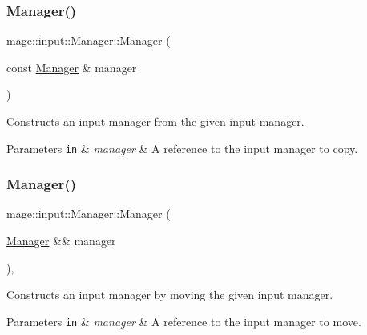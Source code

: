 \subsubsection{\texorpdfstring{Manager()}{Manager()}\hspace{0.1cm}{\footnotesize\ttfamily [2/3]}}
{\footnotesize\ttfamily mage\+::input\+::\+Manager\+::\+Manager (\begin{DoxyParamCaption}\item[{const \hyperlink{classmage_1_1input_1_1_manager}{Manager} \&}]{manager }\end{DoxyParamCaption})\hspace{0.3cm}{\ttfamily [delete]}}

Constructs an input manager from the given input manager.


\begin{DoxyParams}[1]{Parameters}
\mbox{\tt in}  & {\em manager} & A reference to the input manager to copy. \\
\hline
\end{DoxyParams}
\hypertarget{classmage_1_1input_1_1_manager_ab4aae9f96e63bdb8d4ab0de08932b2eb}{}\label{classmage_1_1input_1_1_manager_ab4aae9f96e63bdb8d4ab0de08932b2eb} 
\subsubsection{\texorpdfstring{Manager()}{Manager()}\hspace{0.1cm}{\footnotesize\ttfamily [3/3]}}
{\footnotesize\ttfamily mage\+::input\+::\+Manager\+::\+Manager (\begin{DoxyParamCaption}\item[{\hyperlink{classmage_1_1input_1_1_manager}{Manager} \&\&}]{manager }\end{DoxyParamCaption})\hspace{0.3cm}{\ttfamily [default]}, {\ttfamily [noexcept]}}

Constructs an input manager by moving the given input manager.


\begin{DoxyParams}[1]{Parameters}
\mbox{\tt in}  & {\em manager} & A reference to the input manager to move. \\
\hline
\end{DoxyParams}
\hypertarget{classmage_1_1input_1_1_manager_a2fa35df15cecee8c6842e97912f80edd}{}\label{classmage_1_1input_1_1_manager_a2fa35df15cecee8c6842e97912f80edd} 
